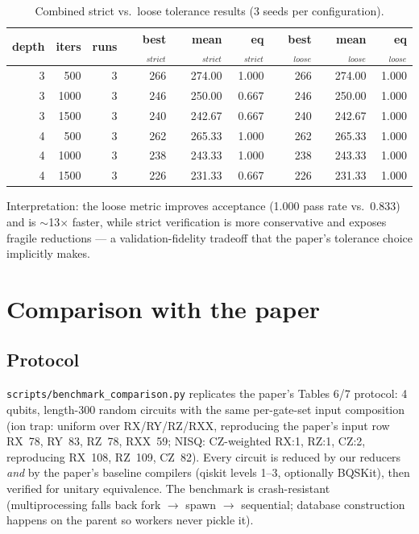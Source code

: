 \documentclass[11pt,a4paper]{article}
\begin{document}
\begin{table}[H]
\centering
\caption{Combined strict vs.\ loose tolerance results (3 seeds per configuration).}
\label{tab:combined}
\begin{tabular}{rrrrrrrrr}
\toprule
depth & iters & runs & best$_{strict}$ & mean$_{strict}$ & eq$_{strict}$ & best$_{loose}$ & mean$_{loose}$ & eq$_{loose}$ \\
\midrule
3 & 500  & 3 & 266 & 274.00 & 1.000 & 266 & 274.00 & 1.000 \\
3 & 1000 & 3 & 246 & 250.00 & 0.667 & 246 & 250.00 & 1.000 \\
3 & 1500 & 3 & 240 & 242.67 & 0.667 & 240 & 242.67 & 1.000 \\
4 & 500  & 3 & 262 & 265.33 & 1.000 & 262 & 265.33 & 1.000 \\
4 & 1000 & 3 & 238 & 243.33 & 1.000 & 238 & 243.33 & 1.000 \\
4 & 1500 & 3 & 226 & 231.33 & 0.667 & 226 & 231.33 & 1.000 \\
\bottomrule
\end{tabular}
\end{table}

Interpretation: the loose metric improves acceptance (1.000 pass rate vs.\
0.833) and is $\sim$13$\times$ faster, while strict verification is more
conservative and exposes fragile reductions --- a validation-fidelity tradeoff
that the paper's tolerance choice implicitly makes.

\section{Comparison with the paper}
\label{sec:comparison}
\subsection{Protocol}
\texttt{scripts/benchmark\_comparison.py} replicates the paper's Tables 6/7
protocol: 4 qubits, length-300 random circuits with the same per-gate-set input
composition (ion trap: uniform over RX/RY/RZ/RXX, reproducing the paper's
input row RX~78, RY~83, RZ~78, RXX~59; NISQ: CZ-weighted RX:1, RZ:1, CZ:2,
reproducing RX~108, RZ~109, CZ~82). Every circuit is reduced by our reducers
\emph{and} by the paper's baseline compilers (qiskit levels 1--3, optionally
BQSKit), then verified for unitary equivalence. The benchmark is crash-resistant
(multiprocessing falls back fork $\to$ spawn $\to$ sequential; database
construction happens on the parent so workers never pickle it).
\end{document}
